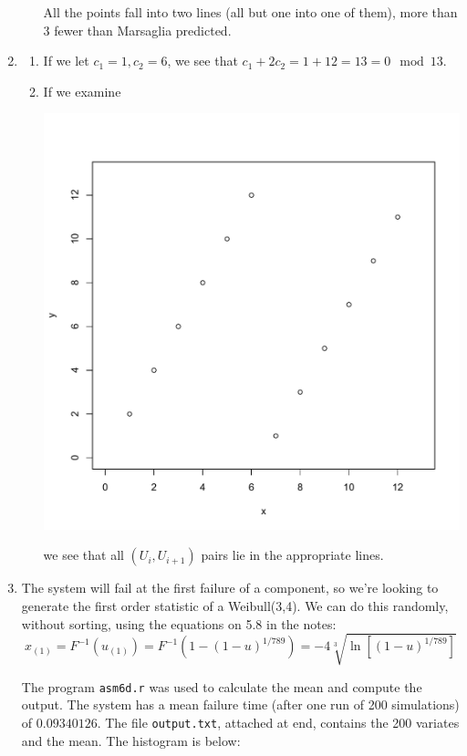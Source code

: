 \documentclass[11pt]{article} %
\newcommand{\inv}{^{-1}}
\begin{document}
\begin{enumerate}
\begin{enumerate}
All the points fall into two lines (all but one into one of them), more than 3 fewer than Marsaglia predicted.

\end{enumerate}

\item \begin{enumerate}

\item If we let $c_1 = 1, c_2 = 6$, we see that $c_1 + 2c_2 = 1 + 12 = 13 = 0\mod13$.

\item If we examine

\includegraphics[scale = .4]{plot3.pdf}

we see that all $(U_i, U_{i+1})$ pairs lie in the appropriate lines.

\end{enumerate}

\item The system will fail at the first failure of a component, so we're looking to generate the first order statistic of a Weibull(3,4).  We can do this randomly, without sorting, using the equations on 5.8 in the notes:
$$x_{(1)} = F\inv(u_{(1)}) = F\inv(1 - (1 - u)^{1/789}) = -4\sqrt[3]{\ln[(1 - u)^{1/789}]}$$

The program \texttt{asm6d.r} was used to calculate the mean and compute the output. The system has a mean failure time (after one run of 200 simulations) of $0.09340126$.  The file \texttt{output.txt}, attached at end, contains the 200 variates and the mean. The histogram is below:


\end{enumerate}
\end{document}
